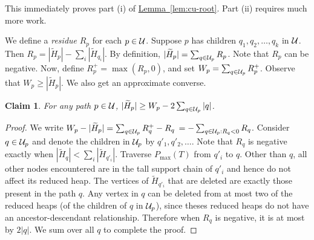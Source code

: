 \documentclass[11pt]{article}
\newcommand{\ignore}[1]{}
\newtheorem{claim}[theorem]{Claim}
\theoremstyle{definition}
\newcommand{\cH}{{\cal H}}
\newcommand{\cU}{{\cal U}}
\newcommand{\Lem}[1]{\hyperref[lem:#1]{Lemma~\ref*{lem:#1}}} %
\newcommand{\pmax}{P_{\max}}
\newcommand{\redH}{\widetilde{H}}
\begin{document}
This immediately proves part (i) of \Lem{cu-root}. Part (ii) requires much more work.

We define a \emph{residue} $R_p$ for each $p \in \cU$. Suppose $p$ has children
$q_1, q_2, \ldots, q_k$ in $\cU$. Then $R_p = |\redH_p| - \sum_i |\redH_{q_i}|$. 
By definition, $|\redH_p| = \sum_{q \in \cU_p} R_p$. 
Note that $R_p$ can be negative. 
Now, define $R^+_p = \max(R_p,0)$, and set $W_p = \sum_{q \in \cU_p} R^+_p$.
Observe that $W_p \geq |\redH_p|$. We also get an approximate converse.


\begin{claim} \label{clm:loss} For any path $p\in \cU$, $|\redH_p| \geq W_p - 2\sum_{q \in \cU_p} |q|$.
\end{claim}

\begin{proof} We write $W_p - |\redH_p| = \sum_{q \in \cU_p} R^+_q - R_q$ $= -\sum_{q \in \cU_p: R_q < 0} R_q$.
Consider $q \in \cU_p$ and denote the children in $\cU_p$ by $q'_1, q'_2, \ldots$.
Note that $R_q$ is negative exactly when $|\redH_q| < \sum_i |\redH_{q'_i}|$.
Traverse $\pmax(T)$ from $q'_i$ to $q$.
Other than $q$, all other nodes encountered are in the tall support chain of $q'_i$ and hence
do not affect its reduced heap.
The vertices of $\redH_{q'_i}$ that are deleted
are exactly those present in the path $q$. 
Any vertex in $q$ can be deleted from at most two of the reduced heaps (of the children of $q$ in $\cU_p$), since 
theses reduced heaps do not have an ancestor-descendant relationship.
Therefore when $R_q$ is negative, it is at most by $2|q|$.
We sum over all $q$ to complete the proof.
\end{proof}

\ignore{Let $D_q = H_q \setminus \bigcup_i H_{q'_i}$. In other words, as we traverse $\cU$,
$D_q$ is the set of vertices ``added" at $q$. Suppose we traverse $\pmax(T)$ from $q'_i$
to $q$. All vertices of $H_{q'_i}$ that lie on these paths are removed.


 and traverse $\pmax(T)$ up to $p$. Suppose we encounter
the paths $q_0 = q, q_1, q_2, \ldots, q_k = p$. The vertices in the residue $R_q$ that 
are removed from $H_p$ are exactly the vertices that lie in these paths. 
We split this contribution into tall and short paths, observing that the latter
are all unsupported. Hence, we can (crudely) upper bound the number of vertices
removed by $\sum_{q \in \cU_p} |q| + \sum_{q \in \cU_p} \sum_{h \in \cH} |h \cap q|$.
Each vertex can be removed from at most two distinct $R_q$'s, completing the proof.
}
\end{document}
